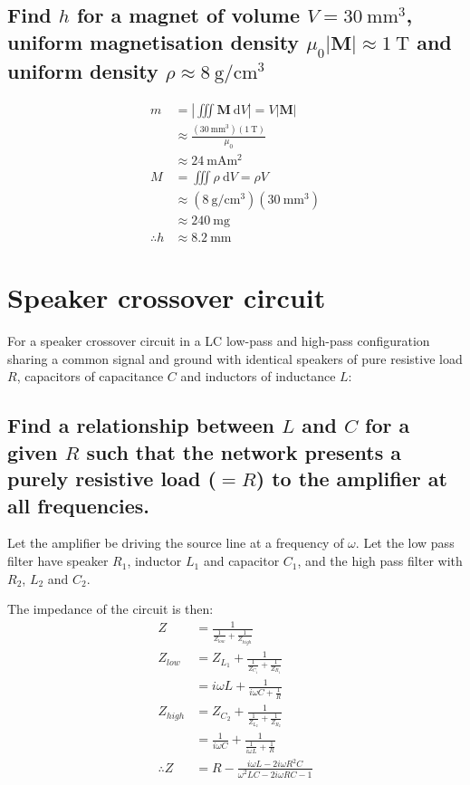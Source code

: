 \documentclass[a4paper]{scrartcl}
\begin{document}
\subsection{Find \(h\) for a magnet of volume \(V = \SI{30}{\milli\metre\cubed}\), uniform magnetisation density \(\mu_0 |\mathbf{M}| \approx \SI{1}{\tesla}\) and uniform density \(\rho \approx \SI{8}{\gram\per\centi\metre\cubed}\)}
\begin{align*}
    m &= \left|\iiint \mathbf{M} \:\mathrm{d}V\right| = V |\mathbf{M}| \\
    &\approx \frac{(\SI{30}{\milli\metre\cubed})(\SI{1}{\tesla})}{\mu_0} \\
    &\approx \SI{24}{\milli\ampere\metre\squared} \\
    M &= \iiint \rho \:\mathrm{d}V = \rho V \\
    &\approx (\SI{8}{\gram\per\centi\metre\cubed})(\SI{30}{\milli\metre\cubed}) \\
    &\approx \SI{240}{\milli\gram} \\
    \therefore h &\approx \SI{8.2}{\milli\metre}
\end{align*}

\section{Speaker crossover circuit}
For a speaker crossover circuit in a LC low-pass and high-pass configuration sharing a common signal and ground with identical speakers of pure resistive load \(R\), capacitors of capacitance \(C\) and inductors of inductance \(L\):

\subsection{Find a relationship between \(L\) and \(C\) for a given \(R\) such that the network presents a purely resistive load (\(= R\)) to the amplifier at all frequencies.}
Let the amplifier be driving the source line at a frequency of \(\omega\). Let the low pass filter have speaker \(R_1\), inductor \(L_1\) and capacitor \(C_1\), and the high pass filter with \(R_2\),  \(L_2\) and  \(C_2\).

The impedance of the circuit is then:
\begin{align*}
    Z &= \frac{1}{\frac{1}{Z_{low}} + \frac{1}{Z_{high}}} \\
    Z_{low} &= Z_{L_1} + \frac{1}{\frac{1}{Z_{C_1}} + \frac{1}{Z_{R_1}}} \\
    &= i \omega L + \frac{1}{i \omega C + \frac{1}{R}} \\
    Z_{high} &= Z_{C_2} + \frac{1}{\frac{1}{Z_{L_2}} + \frac{1}{Z_{R_2}}} \\
    &= \frac{1}{i \omega C} + \frac{1}{\frac{1}{i \omega L} + \frac{1}{R}} \\
    \therefore Z &= R - \frac{i \omega L - 2 i \omega R^2 C}{\omega^2 L C - 2 i \omega R C - 1}
\end{align*}
\end{document}
